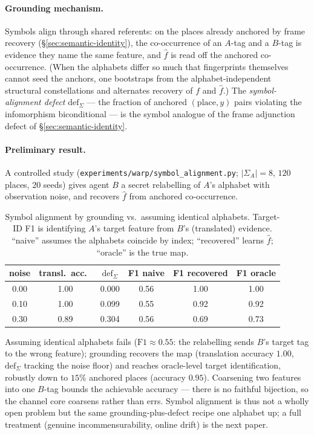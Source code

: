\documentclass{article}
\newcommand{\method}[1]{\texttt{#1}}
\begin{document}
\paragraph{Grounding mechanism.} Symbols align through shared referents: on the
places already anchored by frame recovery (\S\ref{sec:semantic-identity}), the
co-occurrence of an $A$-tag and a $B$-tag is evidence they name the same
feature, and $\hat f$ is read off the anchored co-occurrence. (When the
alphabets differ so much that fingerprints themselves cannot seed the anchors,
one bootstraps from the alphabet-independent structural constellations and
alternates recovery of $f$ and $\hat f$.) The \emph{symbol-alignment defect}
$\mathrm{def}_\Sigma$ --- the fraction of anchored $(\text{place},y)$ pairs
violating the infomorphism biconditional --- is the symbol analogue of the
frame adjunction defect of \S\ref{sec:semantic-identity}.

\paragraph{Preliminary result.} A controlled study
(\method{experiments/warp/symbol\_alignment.py}; $|\Sigma_A|{=}8$, $120$ places,
$20$ seeds) gives agent $B$ a secret relabelling of $A$'s alphabet with
observation noise, and recovers $\hat f$ from anchored co-occurrence.

\begin{table}[h]
\caption{Symbol alignment by grounding vs.\ assuming identical alphabets.
Target-ID F1 is identifying $A$'s target feature from $B$'s (translated)
evidence. ``naive'' assumes the alphabets coincide by index; ``recovered''
learns $\hat f$; ``oracle'' is the true map.}
\label{tab:symbol-alignment}
\centering
\small
\begin{tabular}{c c c c c c}
\toprule
noise & transl.\ acc.\ & $\mathrm{def}_\Sigma$ & F1 naive & F1 recovered & F1 oracle \\
\midrule
0.00 & 1.00 & 0.000 & 0.56 & 1.00 & 1.00 \\
0.10 & 1.00 & 0.099 & 0.55 & 0.92 & 0.92 \\
0.30 & 0.89 & 0.304 & 0.56 & 0.69 & 0.73 \\
\bottomrule
\end{tabular}
\end{table}

Assuming identical alphabets fails ($\text{F1}\approx0.55$: the relabelling
sends $B$'s target tag to the wrong feature); grounding recovers the map
(translation accuracy $1.00$, $\mathrm{def}_\Sigma$ tracking the noise floor)
and reaches oracle-level target identification, robustly down to $15\%$
anchored places (accuracy $0.95$). Coarsening two features into one $B$-tag
bounds the achievable accuracy --- there is no faithful bijection, so the
channel core coarsens rather than errs. Symbol alignment is thus not a wholly
open problem but the same grounding-plus-defect recipe one alphabet up; a full
treatment (genuine incommensurability, online drift) is the next paper.
\end{document}
